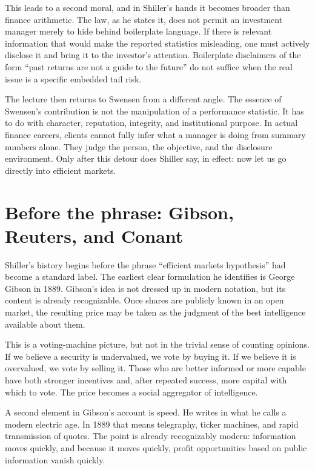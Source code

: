 This leads to a second moral, and in Shiller's hands it becomes broader than finance arithmetic. The law, as he states it, does not permit an investment manager merely to hide behind boilerplate language. If there is relevant information that would make the reported statistics misleading, one must actively disclose it and bring it to the investor's attention. Boilerplate disclaimers of the form ``past returns are not a guide to the future'' do not suffice when the real issue is a specific embedded tail risk.

The lecture then returns to Swensen from a different angle. The essence of Swensen's contribution is not the manipulation of a performance statistic. It has to do with character, reputation, integrity, and institutional purpose. In actual finance careers, clients cannot fully infer what a manager is doing from summary numbers alone. They judge the person, the objective, and the disclosure environment. Only after this detour does Shiller say, in effect: now let us go directly into efficient markets.

\section{Before the phrase: Gibson, Reuters, and Conant}

Shiller's history begins before the phrase ``efficient markets hypothesis'' had become a standard label. The earliest clear formulation he identifies is George Gibson in 1889. Gibson's idea is not dressed up in modern notation, but its content is already recognizable. Once shares are publicly known in an open market, the resulting price may be taken as the judgment of the best intelligence available about them.

This is a voting-machine picture, but not in the trivial sense of counting opinions. If we believe a security is undervalued, we vote by buying it. If we believe it is overvalued, we vote by selling it. Those who are better informed or more capable have both stronger incentives and, after repeated success, more capital with which to vote. The price becomes a social aggregator of intelligence.

A second element in Gibson's account is speed. He writes in what he calls a modern electric age. In 1889 that means telegraphy, ticker machines, and rapid transmission of quotes. The point is already recognizably modern: information moves quickly, and because it moves quickly, profit opportunities based on public information vanish quickly.

